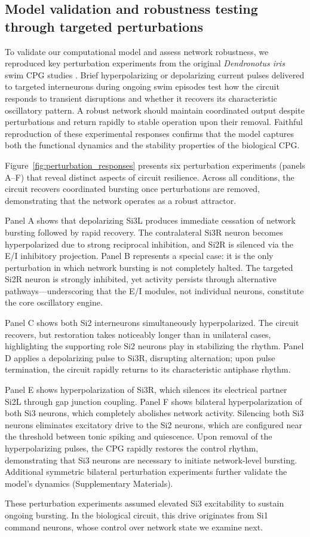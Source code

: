 \subsection{Model validation and robustness testing through targeted perturbations}

To validate our computational model and assess network robustness, we reproduced key perturbation experiments from the original \textit{Dendronotus iris} swim CPG studies \cite{SakuraiKatz2016, sakurai2022bursting}.
Brief hyperpolarizing or depolarizing current pulses delivered to targeted interneurons during ongoing swim episodes test how the circuit responds to transient disruptions and whether it recovers its characteristic oscillatory pattern.
A robust network should maintain coordinated output despite perturbations and return rapidly to stable operation upon their removal.
Faithful reproduction of these experimental responses confirms that the model captures both the functional dynamics and the stability properties of the biological CPG.

Figure~\ref{fig:perturbation_responses} presents six perturbation experiments (panels A--F) that reveal distinct aspects of circuit resilience.
Across all conditions, the circuit recovers coordinated bursting once perturbations are removed, demonstrating that the network operates as a robust attractor.

Panel A shows that depolarizing Si3L produces immediate cessation of network bursting followed by rapid recovery.
The contralateral Si3R neuron becomes hyperpolarized due to strong reciprocal inhibition, and Si2R is silenced via the E/I inhibitory projection.
Panel B represents a special case: it is the only perturbation in which network bursting is not completely halted.
The targeted Si2R neuron is strongly inhibited, yet activity persists through alternative pathways---underscoring that the E/I modules, not individual neurons, constitute the core oscillatory engine.

Panel C shows both Si2 interneurons simultaneously hyperpolarized.
The circuit recovers, but restoration takes noticeably longer than in unilateral cases, highlighting the supporting role Si2 neurons play in stabilizing the rhythm.
Panel D applies a depolarizing pulse to Si3R, disrupting alternation; upon pulse termination, the circuit rapidly returns to its characteristic antiphase rhythm.

Panel E shows hyperpolarization of Si3R, which silences its electrical partner Si2L through gap junction coupling.
Panel F shows bilateral hyperpolarization of both Si3 neurons, which completely abolishes network activity.
Silencing both Si3 neurons eliminates excitatory drive to the Si2 neurons, which are configured near the threshold between tonic spiking and quiescence.
Upon removal of the hyperpolarizing pulses, the CPG rapidly restores the control rhythm, demonstrating that Si3 neurons are necessary to initiate network-level bursting.
Additional symmetric bilateral perturbation experiments further validate the model's dynamics (Supplementary Materials).

These perturbation experiments assumed elevated Si3 excitability to sustain ongoing bursting.
In the biological circuit, this drive originates from Si1 command neurons, whose control over network state we examine next.
